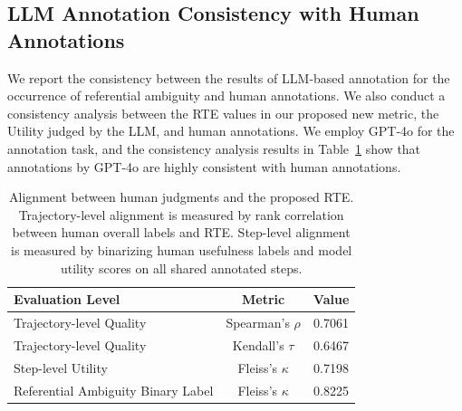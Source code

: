 \documentclass{article} %
\begin{document}
\subsection{LLM Annotation Consistency with Human Annotations}
We report the consistency between the results of LLM‑based annotation for the occurrence of referential ambiguity and human annotations. We also conduct a consistency analysis between the RTE values in our proposed new metric, the Utility judged by the LLM, and human annotations. We employ GPT‑4o for the annotation task, and the consistency analysis results in Table~\ref{tab:human_alignment_rte_refamb} show that annotations by GPT-4o are highly consistent with human annotations.
\begin{table}[htbp]
\centering
\caption{Alignment between human judgments and the proposed RTE. Trajectory-level alignment is measured by rank correlation between human overall labels and RTE. Step-level alignment is measured by binarizing human usefulness labels and model utility scores on all shared annotated steps.}
\label{tab:human_alignment_rte_refamb}
\begin{tabular}{lcc}
\toprule
\textbf{Evaluation Level} & \textbf{Metric} & \textbf{Value} \\
\midrule
Trajectory-level Quality& Spearman's $\rho$ & 0.7061 \\
Trajectory-level Quality& Kendall's $\tau$ & 0.6467 \\
Step-level Utility & Fleiss's $\kappa$ & 0.7198 \\
\midrule
Referential Ambiguity Binary Label & Fleiss's $\kappa$ & 0.8225 \\
\bottomrule
\end{tabular}
\end{table}
\end{document}
